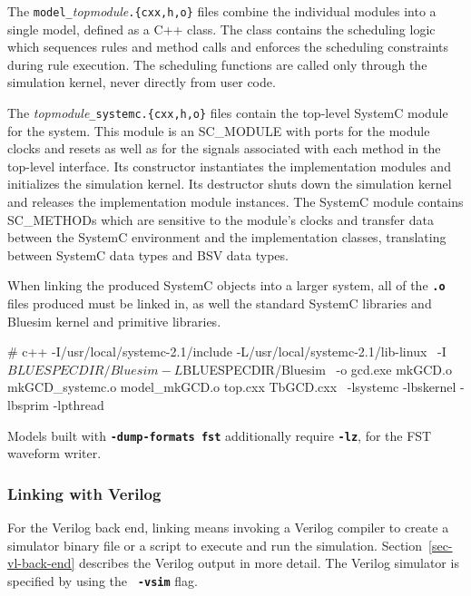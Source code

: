 \documentclass{article}
\newcommand{\te}[1]{\texttt{#1}}
\newenvironment{centerboxverbatim}
  {\center
   \boxedverbatim}
  {\endboxedverbatim
  {\endcenter }}
\begin{document}
The \te{model\_}{\em topmodule}\te{.\{cxx,h,o\}} files combine the
individual modules into a single model, defined as a C++ class.
The class contains the scheduling logic which
sequences rules and method calls and enforces the scheduling
constraints during rule execution.  The scheduling functions are
called only through the simulation kernel, never directly from user
code.

The {\em topmodule}\te{\_systemc.\{cxx,h,o\}} files contain the
top-level SystemC module
for the system.  This module is an SC\_MODULE with ports for the
module clocks and resets as well as for the signals associated with
each method in the top-level interface.  Its constructor instantiates
the implementation modules and initializes the simulation kernel.
Its destructor shuts down the simulation kernel and releases the
implementation module instances.  The SystemC module contains
SC\_METHODs which are sensitive to the module's clocks and transfer
data between the SystemC environment and the implementation classes,
translating between SystemC data types and BSV data types.

When linking the produced SystemC objects into a larger system, all of
the {\bf\tt .o} files produced must be linked in, as well the standard
SystemC libraries and Bluesim kernel and primitive libraries.

\begin{centerboxverbatim}
# c++ -I/usr/local/systemc-2.1/include -L/usr/local/systemc-2.1/lib-linux \
      -I$BLUESPECDIR/Bluesim -L$BLUESPECDIR/Bluesim \
      -o gcd.exe mkGCD.o mkGCD_systemc.o model_mkGCD.o top.cxx TbGCD.cxx \
      -lsystemc -lbskernel -lbsprim -lpthread
\end{centerboxverbatim}

Models built with {\bf\tt -dump-formats fst} additionally require
{\bf\tt -lz}, for the FST waveform writer.


\subsubsection{Linking with Verilog}
\index{Verilog!simulator}

For the Verilog back end, linking means invoking a Verilog compiler to create a
simulator binary file or a script to execute and run the
simulation. Section~\ref{sec-vl-back-end} describes the Verilog
output  in more
detail.  The Verilog simulator is specified by  using the {\bf\tt
-vsim} flag.
\end{document}
